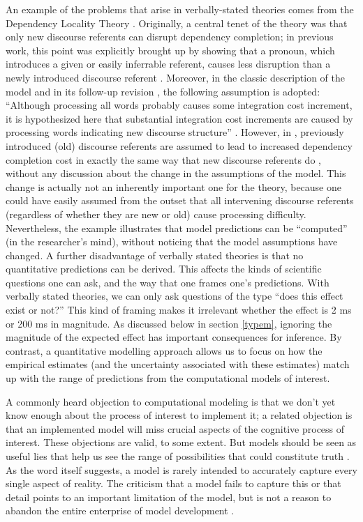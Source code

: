 \documentclass{cambridge7A}\usepackage[]{graphicx}\usepackage[]{color}
\begin{document}
An example of the problems that arise in verbally-stated theories comes from the  Dependency Locality 
Theory \citep{Gibson2000}. Originally, a central tenet of the theory was that only
new discourse referents can disrupt dependency completion; in
previous work, this point was explicitly brought up by showing that a
pronoun, which introduces a given or easily inferrable referent,
causes less disruption than a newly introduced discourse referent
\citep{warrengibson05}. Moreover, in the classic description of the
model \citep{Gibson1998} and in its follow-up revision
\citep{Gibson2000}, the following assumption is adopted: ``Although
processing all words probably causes some integration cost increment,
it is hypothesized here that substantial integration cost increments
are caused by processing words indicating new discourse structure''
\citep[12]{Gibson1998}.  However, in \cite{gibsonwu}, previously
introduced (old) discourse referents are assumed to lead to increased
dependency completion cost in exactly the same way that new  discourse referents do \citep{HsiaoGibson2003}, without any discussion about the change
in the assumptions of the model. This change is actually not an inherently important
one for the theory, because one could have easily assumed from the
outset that all intervening discourse referents (regardless of whether they are new or old) cause 
processing difficulty. Nevertheless, the example illustrates that model
predictions can be ``computed'' (in the researcher's mind), without
noticing that the model assumptions have changed.
A further disadvantage of verbally stated theories is that no 
quantitative predictions can be derived. This affects the kinds of
scientific questions one can ask, and the way that one frames one's predictions. With verbally stated theories, we
can only ask questions of the type ``does this effect exist or not?''
This kind of framing makes it irrelevant whether the effect is 2 ms or 200 ms in
magnitude. As discussed below in section \ref{typem}, ignoring the magnitude of the expected effect has important consequences for inference. By contrast, a  quantitative modelling approach allows us to
focus on how the empirical estimates (and the uncertainty associated
with these estimates) match up with the range of predictions from the
computational models of interest.

A commonly heard objection to computational modeling is that we don't
yet know enough about the process of interest to implement it; a
related objection is that an implemented model will miss crucial
aspects of the cognitive process of interest. These objections are
valid, to some extent. But models should be seen as useful lies that
help us see the range of possibilities that could constitute truth \citep{whymodel}. As the word itself suggests, a
model is rarely intended to accurately capture every single aspect of
reality. The criticism that a model fails to capture this or that detail points to an important limitation of the model, but is not a reason to abandon the entire enterprise of model development  \citep{smaldino2017models}.
\end{document}
